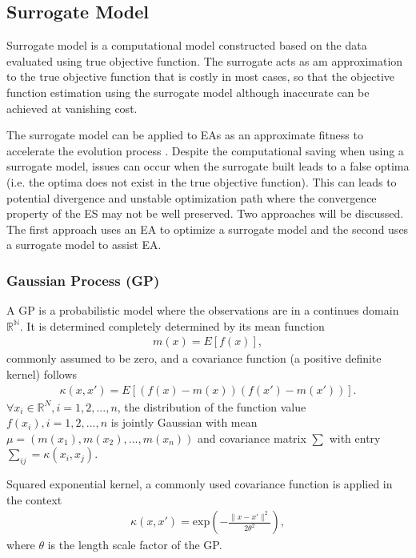 \subsection{Surrogate Model} 

Surrogate model is a computational model constructed based on the data evaluated using true objective function. The surrogate acts as am approximation to the true objective function that is costly in most cases, so that the objective function estimation using the surrogate model although inaccurate can be achieved at vanishing cost. 

The surrogate model can be applied to EAs as an approximate fitness to accelerate the evolution process \cite{Ratle:1998:ACE:645824.668750}. Despite the computational saving when using a surrogate model, issues can occur when the surrogate built leads to a false optima (i.e. the optima does not exist in the true objective function). This can leads to potential divergence and unstable optimization path where the convergence property of the ES may not be well preserved. Two approaches will be discussed. The first approach uses an EA to optimize a surrogate model and the second uses a surrogate model to assist EA. 


\subsubsection{Gaussian Process (GP)}\label{sssec:GP}\hfill

A GP is a probabilistic model where the observations are in a continues domain $\mathbb{R^N}$. It is determined completely determined by its mean function 
\begin{align}
m(x) = E [ f(x)],
\end{align}
commonly assumed to be zero, and a covariance function (a positive definite kernel) follows
\begin{align}
\kappa(x, x \prime) = E[(f(x)-m(x))(f(x \prime)-m(x \prime))].		
\end{align} 
$\forall x_i \in \mathbb{R}^N, i=1,2,...,n$, the distribution of the function value $f(x_i),i=1,2,...,n$ is jointly Gaussian with mean $\mu = (m(x_1),m(x_2),...,m(x_n))$ and covariance matrix $\sum$ with entry $\sum_{ij} = \kappa (x_i,x_j)$. 

Squared exponential kernel, a commonly used covariance function is applied in the context 
\begin{align}
\kappa(x, x \prime) = \text{exp} \left( - \frac{\|x - x \prime \|^2}{2 \theta^2} \right),
\end{align}
where $\theta$ is the length scale factor of the GP.

